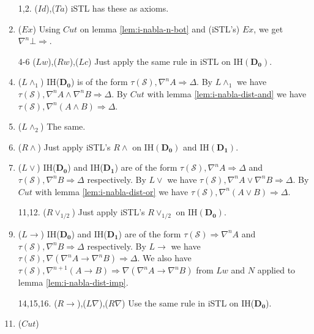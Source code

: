 \begin{enumerate}
	\item[1,2.] ($Id$),($Ta$) iSTL has these as axioms.
	\setcounter{enumi}{2}

	\item ($Ex$) Using $Cut$ on lemma \ref{lem:i-nabla-n-bot} and (iSTL's) $Ex$, we get $\nabla^n \bot \Rightarrow$.

	\item[4-6] ($Lw$),($Rw$),($Lc$) Just apply the same rule in iSTL on IH$(\mathbf{D_0})$.
	\setcounter{enumi}{6}

	\item ($L\land_1$) IH($\mathbf{D_0}$) is of the form $\tau(\mathcal{S}) , \nabla^n A \Rightarrow \Delta$. By $L\land_1$ we have $\tau(\mathcal{S}) , \nabla^n A \land \nabla^n B \Rightarrow \Delta$. By $Cut$ with lemma \ref{lem:i-nabla-dist-and} we have $\tau(\mathcal{S}) , \nabla^n (A \land B) \Rightarrow \Delta$.
	
	\item ($L\land_2$) The same.
	
	\item ($R\land$) Just apply iSTL's $R\land$ on IH$(\mathbf{D_0})$ and IH$(\mathbf{D_1})$.
	
	\item ($L\lor$) IH($\mathbf{D_0}$) and IH($\mathbf{D_1}$) are of the form $\tau(\mathcal{S}) , \nabla^n A \Rightarrow \Delta$ and $\tau(\mathcal{S}) , \nabla^n B \Rightarrow \Delta$ respectively. By $L\lor$ we have $\tau(\mathcal{S}) , \nabla^n A \lor \nabla^n B \Rightarrow \Delta$. By $Cut$ with lemma \ref{lem:i-nabla-dist-or} we have $\tau(\mathcal{S}) , \nabla^n (A \lor B) \Rightarrow \Delta$.
	
	\item[11,12.] ($R\lor_{1/2}$) Just apply iSTL's $R\lor_{1/2}$ on IH$(\mathbf{D_0})$.
	\setcounter{enumi}{12}
	
	\item ($L\rightarrow$) IH($\mathbf{D_0}$) and IH($\mathbf{D_1}$) are of the form $\tau(\mathcal{S}) \Rightarrow \nabla^n A$ and $\tau(\mathcal{S}) , \nabla^n B \Rightarrow \Delta$ respectively. By $L\rightarrow$ we have $\tau(\mathcal{S}) , \nabla (\nabla^n A \rightarrow \nabla^n B) \Rightarrow \Delta$. We also have $\tau(\mathcal{S}) , \nabla^{n+1} (A \rightarrow B) \Rightarrow \nabla (\nabla^n A \rightarrow \nabla^n B)$ from $Lw$ and $N$ applied to lemma \ref{lem:i-nabla-dist-imp}.
	
	\item[14,15,16.] ($R\rightarrow$),($L\nabla$),($R\nabla$) Use the same rule in iSTL on IH($\mathbf{D_0}$).
	\setcounter{enumi}{16}
	
	\item ($Cut$) \todo{}
\end{enumerate}
